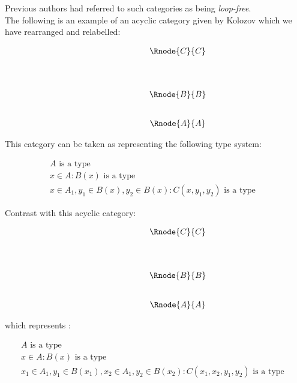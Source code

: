 \documentclass[10pt,a4paper]{article}
\begin{document}
\noindent
Previous authors had referred to such categories as being \textit{loop-free}. \\

\noindent
The following is an example of an acyclic category given by Kolozov which we have rearranged and relabelled:

\begin{center}
\begin{equation}
\begin{array}{p{1.5cm}cccp{2cm}c}
&                & \Rnode{C}{C}&   \\ [1.4cm]
&                & \Rnode{B}{B} &  \\ [0.8cm]
&                & \Rnode{A}{A} &  
\end{array}
\end{equation}
\setlength {\saroffsetA}{-2pt}
\setlength {\saroffsetB}{-2pt}
\sarreset
\end{center}


\noindent This category can be taken as representing the following type system:
\addtocounter{equation}{-1}
\begin{align}
&A\mbox{ is a type} && \tag*{(\theequation a)}\\
&x\in A: B(x) \mbox{ is a type} && \tag*{(\theequation b)}\\
&x\in A_1, y_1 \in B(x), y_2 \in B(x) : C(x,y_1,y_2) \mbox{ is a type} && \tag*{(\theequation c)}
\end{align}

\noindent
Contrast with this acyclic category:
\begin{center}
\begin{equation}
\begin{array}{p{1.5cm}cccp{2cm}c}
&                & \Rnode{C}{C}&   \\ [1.4cm]
&                & \Rnode{B}{B} &  \\ [0.8cm]
&                & \Rnode{A}{A} &  
\end{array}
\end{equation}

\setlength {\saroffsetA}{-2pt}
\setlength {\saroffsetB}{-2pt}
\setlength {\saroffsetA}{2pt}
\setlength {\saroffsetB}{2pt}
\sarreset
\end{center}
\noindent
which represents :
\addtocounter{equation}{-1}
\begin{align}
&A\mbox{ is a type} && \tag*{(\theequation a)}\\
&x\in A: B(x) \mbox{ is a type} && \tag*{(\theequation b)}\\
&x_1\in A_1, y_1 \in B(x_1), x_2\in A_1, y_2 \in B(x_2) : C(x_1,x_2,y_1,y_2) \mbox{ is a type} && \tag*{(\theequation c)}
\end{align}
\end{document}
